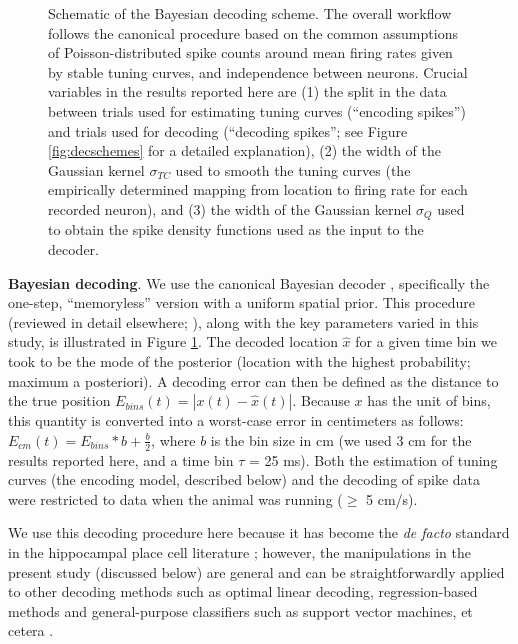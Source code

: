 \documentclass[11pt]{article}
\let\cite=\citep
\let\citeNP=\citealt
\begin{document}
\begin{figure}[h]
  \centering
  \caption{Schematic of the Bayesian decoding scheme. The overall
    workflow follows the canonical procedure based on the common
    assumptions of Poisson-distributed spike counts around mean firing
    rates given by stable tuning curves, and independence between
    neurons. Crucial variables in the results reported here are (1)
    the split in the data between trials used for estimating tuning
    curves (``encoding spikes'') and trials used for decoding
    (``decoding spikes''; see Figure \ref{fig:decschemes} for a
    detailed explanation), (2) the width of the Gaussian kernel
    $\sigma_{TC}$ used to smooth the tuning curves (the empirically
    determined mapping from location to firing rate for each recorded
    neuron), and (3) the width of the Gaussian kernel $\sigma_{Q}$
    used to obtain the spike density functions used as the input to
    the decoder.}
  \label{fig:decoding_schema}
\end{figure}

{\bf Bayesian decoding}. We use the canonical Bayesian decoder
\cite{Brown1998,Zhang1998}, specifically the one-step, ``memoryless''
version with a uniform spatial prior. This procedure (reviewed in
detail elsewhere;
\citeNP{Johnson2009b,VanderMeer2010c,Kloosterman2014}), along with the
key parameters varied in this study, is illustrated in Figure
\ref{fig:decoding_schema}. The decoded location $\hat{x}$ for a given
time bin we took to be the mode of the posterior (location with the
highest probability; maximum a posteriori). A decoding error can then
be defined as the distance to the true position $E_{bins}(t) =
|x(t)-\hat{x}(t)|$. Because $x$ has the unit of bins, this quantity is
converted into a worst-case error in centimeters as follows:
$E_{cm}(t) = E_{bins}*b + \frac{b}{2}$, where $b$ is the bin size in
cm (we used 3 cm for the results reported here, and a time bin $\tau$
= 25 ms). {\color{black} Both the estimation of tuning curves (the
  encoding model, described below) and the decoding of spike data were
  restricted to data when the animal was running ($\ge$ 5 cm/s).}

We use this decoding procedure here because it has become the {\it de
  facto} standard in the hippocampal place cell literature
\cite{Kloosterman2014,Silva2015,Grosmark2016}; however, the
manipulations in the present study (discussed below) are general and
can be straightforwardly applied to other decoding methods such as
optimal linear decoding, regression-based methods and general-purpose
classifiers such as support vector machines, et cetera
\cite{Pereira2009,Pillow2011,Deng2015}.
\end{document}
